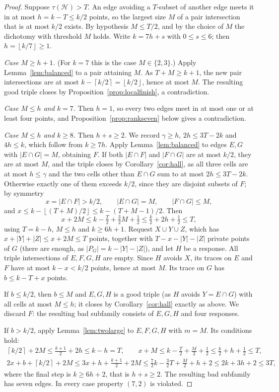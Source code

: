 \documentclass[11pt]{article}
\numberwithin{equation}{section}
\theoremstyle{definition}
\theoremstyle{remark}
\newcommand{\HH}{\mathcal H}
\newcommand{\ceil}[1]{\left\lceil #1\right\rceil}
\newcommand{\floor}[1]{\left\lfloor #1\right\rfloor}
\begin{document}
\begin{proof}
Suppose $\tau(\HH)>T$. An edge avoiding a $T$-subset of another edge
meets it in at most $h=k-T\le k/2$ points, so the largest size $M$ of a
pair intersection that is at most $k/2$ exists. By hypothesis
$M\le T/2$, and by the choice of $M$ the dichotomy with threshold $M$
holds. Write $k=7h+s$ with $0\le s\le6$; then $h=\floor{k/7}\ge1$.

\emph{Case $M\ge h+1$.} (For $k=7$ this is the case $M\in\{2,3\}$.) Apply
Lemma~\ref{lem:balanced} to a pair attaining $M$. As $T+M\ge k+1$, the new pair intersections are at most
$k-\ceil{k/2}=\floor{k/2}$, hence at most $M$. The resulting good
triple closes by Proposition~\ref{prop:localfinish}, a contradiction.

\emph{Case $M\le h$ and $k=7$.} Then $h=1$, so every two edges meet in
at most one or at least four points, and
Proposition~\ref{prop:rankseven} below gives a contradiction.

\emph{Case $M\le h$ and $k\ge8$.} Then $h+s\ge2$. We record $\gamma\ge h$, $2h\le3T-2k$ and $4h\le k$,
which follow from $k\ge7h$. Apply Lemma~\ref{lem:balanced} to edges
$E,G$ with $|E\cap G|=M$, obtaining $F$. If both $|E\cap F|$ and
$|F\cap G|$ are at most $k/2$, they are at most $M$, and the triple
closes by Corollary~\ref{cor:hall}, as all three cells are at most
$h\le\gamma$ and the two cells other than $E\cap G$ sum to at most
$2h\le3T-2k$. Otherwise exactly one of them exceeds $k/2$, since they
are disjoint subsets of $F$; by symmetry
\[
 x=|E\cap F|>k/2,\qquad |E\cap G|=M,\qquad |F\cap G|\le M,
\]
and $x\le k-\floor{(T+M)/2}\le k-(T+M-1)/2$. Then
\[
 x+2M\le k-\tfrac T2+\tfrac32M+\tfrac12\le\tfrac k2+2h+\tfrac12\le T,
\]
using $T=k-h$, $M\le h$ and $k\ge6h+1$. Request $X\cup Y\cup Z$, which has
$x+|Y|+|Z|\le x+2M\le T$ points, together with $T-x-|Y|-|Z|$ private
points of $G$ (there are enough, as $|P_G|=k-|Y|-|Z|$), and let $H$ be a
response. All triple intersections of $E,F,G,H$ are empty. Since $H$
avoids $X$, its traces on $E$ and $F$ have at most $k-x<k/2$ points,
hence at most $M$. Its trace on $G$ has $b\le k-T+x$ points.

If $b\le k/2$, then $b\le M$ and $E,G,H$ is a good triple (as $H$ avoids
$Y=E\cap G$) with all cells at most $M\le h$; it closes by
Corollary~\ref{cor:hall} exactly as above. We discard $F$: the resulting
bad subfamily consists of $E,G,H$ and four responses.

If $b>k/2$, apply Lemma~\ref{lem:twolarge} to $E,F,G,H$ with $m=M$. Its
conditions hold:
\begin{gather*}
 \ceil{k/2}+2M\le\tfrac{k+1}2+2h\le k-h=T,\qquad
 x+M\le k-\tfrac T2+\tfrac M2+\tfrac12\le\tfrac k2+h+\tfrac12\le T,\\
 2x+b+\ceil{k/2}+2M\le3x+h+\tfrac{k+1}2+2M
 \le\tfrac72k-\tfrac32T+\tfrac M2+h+2\le2k+3h+2\le3T,
\end{gather*}
where the final step is $k\ge6h+2$, that is $h+s\ge2$. The resulting bad
subfamily has seven edges. In every case property $(7,2)$ is violated.
\end{proof}
\end{document}
